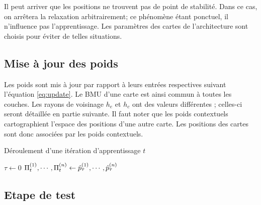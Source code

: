 Il peut arriver que les positions ne trouvent pas de point de stabilité. Dans ce cas, on arrêtera la relaxation arbitrairement; ce phénomène étant ponctuel, il n'influence pas l'apprentissage. Les paramètres des cartes de l'architecture sont choisis pour éviter de telles situations.

\subsection{Mise à jour des poids}
Les poids sont mis à jour par rapport à leurs entrées respectives suivant l'équation \ref{eq:update}. Le BMU d'une carte est ainsi commun à toutes les couches. Les rayons de voisinage $h_e$ et $h_c$ ont des valeurs différentes ; celles-ci seront détaillée en partie suivante. 
Il faut noter que les poids contextuels cartographient l'espace des positions d'une autre carte. Les positions des cartes sont donc associées par les poids contextuels.
\begin{algorithm}\label{algo:cxsom}
\caption{Déroulement d'une itération d'apprentissage $t$}
\SetAlgoLined
  $\tau \leftarrow 0$ \;
  $\Pi^{({1})}_t, \cdots, \Pi^{({n})}_t \leftarrow \hat{p}^{({1})}_\tau, \cdots , \hat{p}^{({n})}_\tau$ \;
 \end{algorithm}


\subsection{Etape de test}

